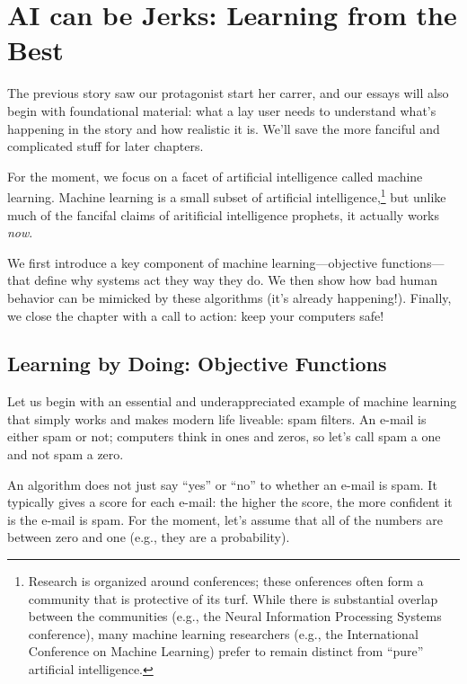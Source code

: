 
\newcommand{\salesjerk}[0]{Levi}

\chapter{AI can be Jerks: Learning from the Best}

The previous story saw our protagonist start her carrer, and our
essays will also begin with foundational material: what a lay user needs
to understand what's happening in the story and how realistic it is.
We'll save the more fanciful and complicated stuff for later chapters.

For the moment, we focus on a facet of artificial intelligence called
machine learning.  Machine learning is a small subset of artificial
intelligence,\footnote{Research is organized around conferences; these
  onferences often form a community that is protective of its turf.
  While there is substantial overlap between the communities (e.g.,
  the Neural Information Processing Systems conference), many machine
  learning researchers (e.g., the International Conference on Machine
  Learning) prefer to remain distinct from ``pure'' artificial
  intelligence.} but unlike much of the fancifal claims of aritificial
intelligence prophets, it actually works \emph{now}.


We first introduce a key component of machine learning---objective
functions---that define why systems act they way they do. We then show
how bad human behavior can be mimicked by these algorithms (it's
already happening!).  Finally, we close the chapter with a call to
action: keep your computers safe!

\section{Learning by Doing: Objective Functions}
\label{sec:objective-functions}

Let us begin with an essential and underappreciated example of machine
learning that simply works and makes modern life liveable: spam
filters.  An e-mail is either spam or not; computers think in ones and
zeros, so let's call spam a one and not spam a zero.

An algorithm does not just say ``yes'' or ``no'' to whether an e-mail
is spam.  It typically gives a score for each e-mail: the higher the
score, the more confident it is the e-mail is spam.  For the moment,
let's assume that all of the numbers are between zero and one (e.g.,
they are a probability).

